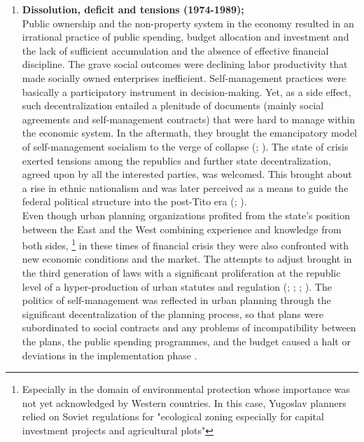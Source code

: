 \documentclass[11pt]{report}
\begin{document}
{{{{\begin{enumerate}
Urban planning discourse at the time was grounded on a highly comprehensive, integrated, and fully decentralized process closely coupled with the economic and social spheres, with a high level of public participatory programmes concerning physical development (\href{Nedovic}{\citealt{nedovic-budic_mornings_2011}}).

\item \textbf{Dissolution, deficit and tensions (1974-1989);}
\\
Public ownership and the non-property system in the economy resulted in an irrational practice of public spending, budget allocation and investment and the lack of sufficient accumulation and the absence of effective financial discipline. The grave social outcomes were declining labor productivity that made socially owned enterprises inefficient. Self-management practices were basically a participatory instrument in decision-making. Yet, as a side effect, such decentralization entailed a plenitude of documents (mainly social agreements and self-management contracts) that were hard to manage within the economic system. In the aftermath, they brought the emancipatory model of self-management socialism to the verge of collapse (\href{Lydall}{\citealt{lydall_yugoslav_1986}}; \href{Lydall}{\citealt{lydall_yugoslavia_1989}}).
The state of crisis exerted tensions among the republics and further state decentralization, agreed upon by all the interested parties, was welcomed. This brought about a rise in ethnic nationalism and was later perceived as a means to guide the federal political structure into the post-Tito era (\href{Estrin}{\citealt{estrin_yugoslavia:_1991}}; \href{Vujosevic}{\citealt{vujosevic_postsocijalisticka_2010}}).
\\

Even though urban planning organizations profited from the state’s position between the East and the West combining experience and knowledge from both sides,
\footnote{Especially in the domain of environmental protection whose importance was not yet acknowledged by Western countries. In this case, Yugoslav planners relied on Soviet regulations for "ecological zoning especially for capital investment projects and agricultural plots"}
in these times of financial crisis they were also confronted with new economic conditions and the market. The attempts to adjust brought in the third generation of laws with a significant proliferation at the republic level of a hyper-production of urban statutes and regulation (\href{Borovnica}{\citealt{borovnica_osvrt_1980}}; \href{Pajovic}{\citealt{pajovic_pregled_2005}}; \href{Nedovic}{\citealt{nedovic-budic_mornings_2011}}; \href{Peric}{\citealt{peric_evolution_2016}}).
The politics of self-management was reflected in urban planning through the significant decentralization of the planning process, so that plans were subordinated to social contracts and any problems of incompatibility between the plans, the public spending programmes, and the budget caused a halt or deviations in the implementation phase .


\end{enumerate}}}}}
\end{document}
